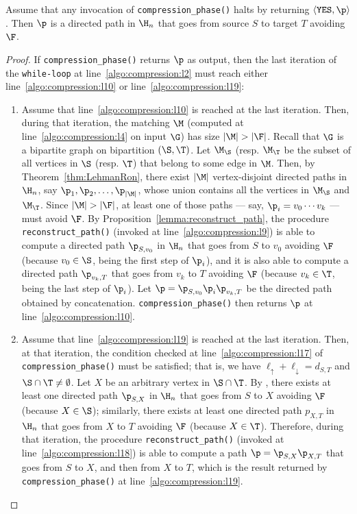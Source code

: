 \begin{lemma}\label{lemma:compression_path}
Assume that any invocation of \texttt{compression\_phase()} halts by returning $\langle\texttt{YES},\p\rangle$.
Then $\p$ is a directed path in $\H_n$ that goes from source $S$ to target $T$ avoiding $\F$.
\end{lemma}
\begin{proof}
If \texttt{compression\_phase()} returns $\p$ as output, then the last iteration of the
\texttt{while-loop} at line~\ref{algo:compression:l2} must reach
either line~\ref{algo:compression:l10} or line~\ref{algo:compression:l19}:
\begin{enumerate}
\item
Assume that line~\ref{algo:compression:l10} is reached at the last iteration.
Then, during that iteration, the matching $\M$ (computed at line~\ref{algo:compression:l4} on input $\G$) has size $|\M| > |\F|$.
Recall that $\G$ is a bipartite graph on bipartition $(\S, \T)$.
Let $\M_\S$ (resp. $\M_\T$ be the subset of all vertices in $\S$ (resp. $\T$) that
belong
to some edge in $\M$. Then, by Theorem~\ref{thm:LehmanRon}, there exist $|\M|$ vertex-disjoint directed paths in $\H_n$, say
$\p_1, \p_2, \ldots, \p_{|\M|}$, whose union contains all the vertices in $\M_\S$ and $\M_\T$.
Since $|\M|>|\F|$, at least one of those paths --- say, $\p_i=v_0\cdots v_k$ --- must avoid $\F$.
By Proposition~\ref{lemma:reconstruct_path}, the procedure
\texttt{reconstruct\_path()} (invoked at line~\ref{algo:compression:l9}) is
able
to compute a directed path $\p_{S, v_0}$ in $\H_n$ that goes from $S$ to $v_0$ avoiding $\F$
(because $v_0\in\S$, being the first step of $\p_i$), and it is also
able
to compute a directed path $\p_{v_k,T}$
that goes from $v_k$ to $T$ avoiding $\F$ (because $v_k\in\T$, being the last step of $\p_i$).
Let $\p=\p_{S, v_0} \p_i \p_{v_k,T}$ be the directed path obtained by concatenation.
\texttt{compression\_phase()} then returns $\p$ at line~\ref{algo:compression:l10}.
\item
Assume that line~\ref{algo:compression:l19} is reached at the last iteration.
Then, at that iteration, the condition checked at line~\ref{algo:compression:l17} of \texttt{compression\_phase()} must be satisfied;
that is, we have $\ell_\uparrow + \ell_\downarrow=d_{S,T}$ and $\S\cap\T\neq\emptyset$.
Let $X$ be an arbitrary vertex in $\S\cap\T$.
By , there exists at least one directed path $\p_{S,X}$ in $\H_n$
that goes from $S$ to $X$ avoiding $\F$ (because $X\in\S$);
similarly, there exists at least one directed path $p_{X,T}$ in $\H_n$ that goes from $X$ to $T$ avoiding $\F$ (because $X\in\T$).
Therefore, during that iteration, the procedure \texttt{reconstruct\_path()}
(invoked at line~\ref{algo:compression:l18}) is
able
to compute a path $\p=\p_{S,X}\p_{X,T}$ that goes from $S$ to $X$, and then from $X$ to $T$, which is the result
returned by \texttt{compression\_phase()} at line~\ref{algo:compression:l19}.
\end{enumerate}
\end{proof}

